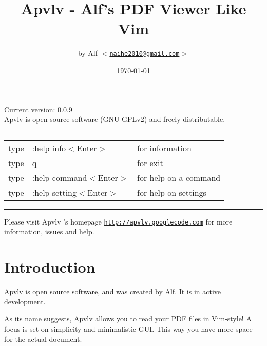 \documentclass[a4paper,12pt]{article}
\newcommand{\apvlv}{\textsf{Apvlv{ }}}
\begin{document}
\large

\title{Apvlv - Alf's PDF Viewer Like Vim}
\author{by Alf \texttt{$<$\href{mailto:naihe2010@gmail.com}{naihe2010@gmail.com}$>$}}
\date{\today}
\maketitle{}

\begin{center}
Current version: 0.0.9\\
\vspace{1cm}
\apvlv is open source software (GNU GPLv2) and freely distributable.
\vspace{1cm}

\rule{\textwidth}{1pt}
\begin{tabular}{lll}
type & :help info$<$Enter$>$      & for information \\
type & q                          & for exit \\
type & :help command$<$Enter$>$   & for help on a command \\
type & :help setting$<$Enter$>$   & for help on settings \\ %
\end{tabular}
\rule{\textwidth}{1pt}



\vspace{3cm}
{\small Please visit \apvlv's homepage \texttt{\href{http://apvlv.googlecode.com}{http://apvlv.googlecode.com}} for more information, issues and help.}
\end{center}

\newpage

\section{Introduction}\label{intro}

\apvlv is open source software, and was created by Alf. It is in active development. %

As its name suggests, \apvlv allows you to read your PDF files in Vim-style! A focus is set on simplicity and minimalistic GUI. This way you have more space for the actual document.
\end{document}
